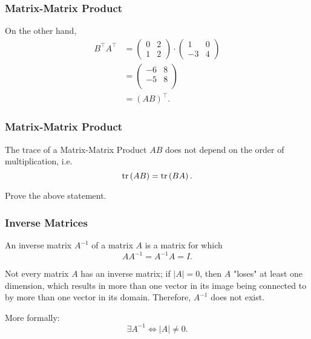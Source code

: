 \begin{frame}
  \frametitle{Matrix-Matrix Product}
  \begin{presentation_example}
    On the other hand,
    \begin{align*}
      B^{\top}A^{\top} &= \begin{pmatrix} 0 & 2 \\ 1 & 2 \end{pmatrix}\cdot\begin{pmatrix} 1 & 0 \\ -3 & 4 \end{pmatrix}\\
      &= \begin{pmatrix} -6 & 8 \\ -5 & 8 \\ \end{pmatrix}\\
      &= \left( AB \right)^{\top}.
    \end{align*}
  \end{presentation_example}
\end{frame}

\begin{frame}
  \frametitle{Matrix-Matrix Product}
  The trace of a Matrix-Matrix Product $AB$ does not depend on the order of multiplication, i.e.
  \begin{equation*}
    \operatorname{tr}\left( AB \right) = \operatorname{tr}\left( BA \right).
  \end{equation*}
  \begin{presentation_challenge}
    Prove the above statement.
  \end{presentation_challenge}
\end{frame}

\begin{frame}
  \frametitle{Inverse Matrices}
  An inverse matrix $A^{-1}$ of a matrix $A$ is a matrix for which
  \begin{equation*}
    AA^{-1} = A^{-1}A = I.
  \end{equation*}

  Not every matrix $A$ has an inverse matrix; if $|A|=0$, then $A$ "loses" at least one dimension, which results in more than one vector in its image being connected to by more than one vector in its domain. Therefore, $A^{-1}$ does not exist.

  More formally:
  \begin{equation*}
    \exists A^{-1} \Leftrightarrow |A|\neq0.
  \end{equation*}
\end{frame}


